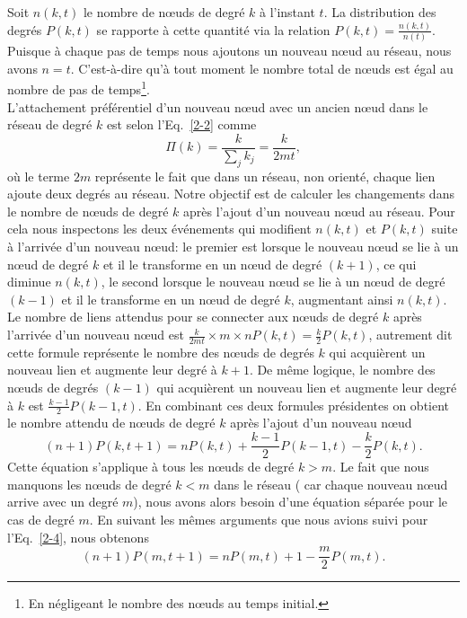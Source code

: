 Soit $n(k,t)$ le nombre de nœuds de degré $k$ à l'instant $t$. La distribution des degrés $P(k,t)$ se rapporte à cette quantité via la relation $P(k,t)=\frac{n(k,t)}{n(t)}$. Puisque à chaque pas de temps nous ajoutons un nouveau nœud au réseau, nous avons $n=t$. C'est-à-dire qu'à tout moment le nombre total de nœuds est égal au nombre de pas de temps\footnote{En négligeant le nombre des nœuds au temps initial.}.\\
L'attachement préférentiel d'un nouveau nœud avec un ancien nœud dans le réseau de degré $k$ est selon l'Eq.~\eqref{2-2}  comme
\begin{equation}
\Pi(k)=\frac{k}{\sum_{j}k_j}=\frac{k}{2mt},
\end{equation}
où le terme $2m$ représente le fait que dans un réseau, non orienté, chaque lien ajoute deux degrés au réseau. Notre objectif est de calculer les changements dans le nombre de nœuds de degré $k$ après l'ajout d'un nouveau nœud au réseau. Pour cela nous inspectons les deux événements qui modifient $n(k,t)$ et $P(k,t)$ suite à l'arrivée d'un nouveau nœud: le premier est lorsque le nouveau nœud se lie à un nœud  de degré $k$ et il le transforme en un nœud de degré $(k+1)$, ce qui diminue $n(k,t)$, le second lorsque le nouveau nœud se lie à un nœud de degré $(k-1)$ et il le transforme en un nœud de degré $k$, augmentant ainsi $n(k,t)$.\\
Le nombre de liens attendus pour se connecter aux nœuds de degré $k$ après l'arrivée d'un nouveau nœud est $\frac{k}{2mt}\times m\times nP(k,t)=\frac{k}{2}P(k,t)$, autrement dit cette formule représente le nombre des nœuds de degrés $k$ qui acquièrent un nouveau lien et augmente leur degré à $k+1$. De même logique, le nombre des nœuds de degrés $(k-1)$ qui acquièrent un nouveau lien et augmente leur degré à $k$ est $\frac{k-1}{2}P(k-1,t)$.
En combinant ces deux formules présidentes on obtient le nombre attendu de nœuds de degré $k$ après l'ajout d'un nouveau nœud
\begin{equation}
(n+1)P(k,t+1)=nP(k,t)+\frac{k-1}{2}P(k-1,t)-\frac{k}{2}P(k,t).
\label{2-4}
\end{equation}
Cette équation s'applique à tous les nœuds de degré $k>m$. Le fait que nous manquons les nœuds de degré $k<m$ dans le réseau ( car chaque nouveau nœud arrive avec un degré $m$), nous avons alors besoin d'une équation séparée pour le cas de degré $m$. En suivant les mêmes arguments que nous avions suivi pour l'Eq.~\eqref{2-4}, nous obtenons
\begin{equation}
(n+1)P(m,t+1)=nP(m,t)+1-\frac{m}{2}P(m,t).
\label{2-5}
\end{equation}
